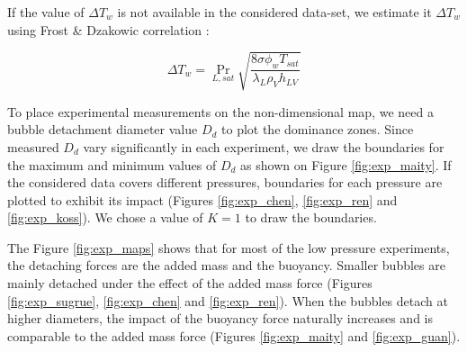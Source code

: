 If the value of $\Delta T_{w}$ is not available in the considered data-set, we estimate it $\Delta T_{w}$ using Frost \& Dzakowic correlation \cite{frost_extension_1967}:

\begin{equation}
\Delta T_{w} = \Pr_{L,sat} \sqrt{\frac{8 \sigma \phi_{w} T_{sat}}{\lambda_{L}\rho_{V}h_{LV}}}
\label{eq:frost}
\end{equation}


\npar 

To place experimental measurements on the non-dimensional map, we need a bubble detachment diameter value $D_{d}$ to plot the dominance zones. Since measured $D_{d}$ vary significantly in each experiment, we draw the boundaries for the maximum and minimum values of $D_{d}$ as shown on Figure \ref{fig:exp_maity}. If the considered data covers different pressures, boundaries for each pressure are plotted to exhibit its impact (Figures \ref{fig:exp_chen}, \ref{fig:exp_ren} and \ref{fig:exp_koss}). We chose a value of $K=1$ to draw the boundaries.

\npar

The Figure \ref{fig:exp_maps} shows that for most of the low pressure experiments, the detaching forces are the added mass and the buoyancy. Smaller bubbles are mainly detached under the effect of the added mass force (Figures \ref{fig:exp_sugrue}, \ref{fig:exp_chen} and \ref{fig:exp_ren}). When the bubbles detach at higher diameters, the impact of the buoyancy force naturally increases and is comparable to the added mass force (Figures \ref{fig:exp_maity} and \ref{fig:exp_guan}).


